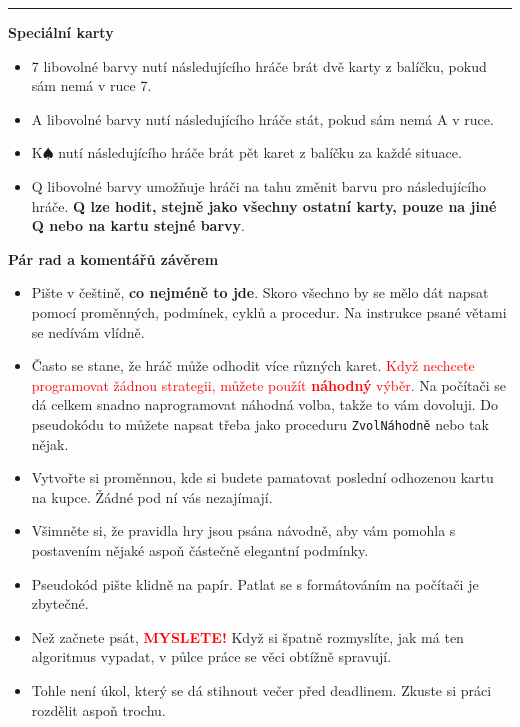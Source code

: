\documentclass[a4paper,11pt]{article}
\begin{document}
\vspace{\parskip}
\hrule

\textbf{Speciální karty}
\begin{itemize}
 \item 7 libovolné barvy nutí následujícího hráče brát dvě karty z balíčku,
  pokud sám nemá v ruce 7.
 \item A libovolné barvy nutí následujícího hráče stát, pokud sám nemá A v ruce.
 \item K$\spadesuit$ nutí následujícího hráče brát pět karet z balíčku za každé
  situace.
 \item Q libovolné barvy umožňuje hráči na tahu změnit barvu pro následujícího
  hráče. \textbf{Q lze hodit, stejně jako všechny ostatní karty, pouze na jiné
  Q nebo na kartu stejné barvy}.
\end{itemize}

\textbf{Pár rad a komentářů závěrem}
\begin{itemize}
 \item Pište v češtině, \textbf{co nejméně to jde}. Skoro všechno by se mělo dát
  napsat pomocí proměnných, podmínek, cyklů a procedur. Na instrukce psané
  větami se nedívám vlídně.
 \item Často se stane, že hráč může odhodit více různých karet.
  \textcolor{red}{Když nechcete programovat žádnou strategii, můžete použít
  \textbf{náhodný} výběr.} Na počítači se dá celkem snadno naprogramovat náhodná
  volba, takže to vám dovoluji. Do pseudokódu to můžete napsat třeba jako
  proceduru \texttt{ZvolNáhodně} nebo tak nějak.
 \item Vytvořte si proměnnou, kde si budete pamatovat poslední odhozenou kartu
  na kupce. Žádné pod ní vás nezajímají.
 \item Všimněte si, že pravidla hry jsou psána návodně, aby vám pomohla s
  postavením nějaké aspoň částečně elegantní podmínky.
 \item Pseudokód pište klidně na papír. Patlat se s formátováním na počítači je
  zbytečné.
 \item Než začnete psát, \textcolor{red}{\textbf{MYSLETE!}} Když si špatně
  rozmyslíte, jak má ten algoritmus vypadat, v půlce práce se věci obtížně
  spravují.
 \item Tohle není úkol, který se dá stihnout večer před deadlinem. Zkuste si
  práci rozdělit aspoň trochu.
\end{itemize}
\end{document}
